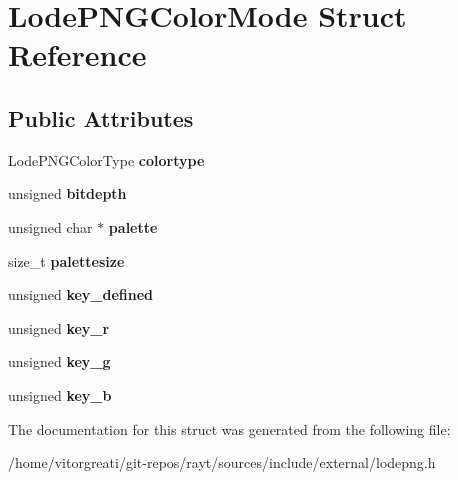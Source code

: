 \hypertarget{struct_lode_p_n_g_color_mode}{}\section{Lode\+P\+N\+G\+Color\+Mode Struct Reference}
\label{struct_lode_p_n_g_color_mode}
\subsection*{Public Attributes}
\begin{DoxyCompactItemize}
\item 
\mbox{\label{struct_lode_p_n_g_color_mode_a4f3df7240411abe80546052d197fbe8d}} 
Lode\+P\+N\+G\+Color\+Type {\bfseries colortype}
\item 
\mbox{\label{struct_lode_p_n_g_color_mode_ad20010b9561980f65281bc17f7848253}} 
unsigned {\bfseries bitdepth}
\item 
\mbox{\label{struct_lode_p_n_g_color_mode_a54f0a793238009fcb95f081626fae308}} 
unsigned char $\ast$ {\bfseries palette}
\item 
\mbox{\label{struct_lode_p_n_g_color_mode_a407557f056168682d9319aeb60866dcc}} 
size\+\_\+t {\bfseries palettesize}
\item 
\mbox{\label{struct_lode_p_n_g_color_mode_ab9105505c5d56cfc6ce4efe1bb288b54}} 
unsigned {\bfseries key\+\_\+defined}
\item 
\mbox{\label{struct_lode_p_n_g_color_mode_a29e64327bca1f3d16235e9ff471e4d50}} 
unsigned {\bfseries key\+\_\+r}
\item 
\mbox{\label{struct_lode_p_n_g_color_mode_ad98309f36d289392b0c440baa50af9f6}} 
unsigned {\bfseries key\+\_\+g}
\item 
\mbox{\label{struct_lode_p_n_g_color_mode_a93a269405fee0d1c5045a1a671ed1de8}} 
unsigned {\bfseries key\+\_\+b}
\end{DoxyCompactItemize}


The documentation for this struct was generated from the following file\+:\begin{DoxyCompactItemize}
\item 
/home/vitorgreati/git-\/repos/rayt/sources/include/external/lodepng.\+h\end{DoxyCompactItemize}
